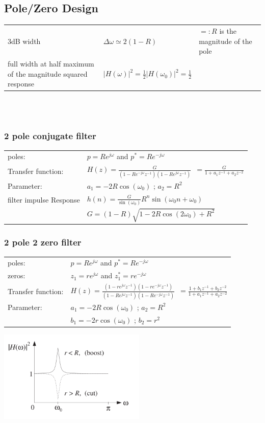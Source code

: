 \subsection{Pole/Zero Design}
\begin{tabularx}{1\textwidth}{Xll}
	3dB width & $\Delta\omega \simeq 2(1-R)$ & $=:R$ is the magnitude of the pole \\
	full width at half maximum of the magnitude squared response & $|H(\omega)|^2=\frac{1}{2}|H(\omega_0)|^2=\frac{1}{2}$&
\end{tabularx}\\ \\

\subsubsection{2 pole conjugate filter}

\begin{tabularx}{1\textwidth}{l X}
	poles: & $ p = R e^{j\omega}$ \qquad and \qquad $ p^* = R e^{-j\omega}$
	\\ 
	Transfer function: & $H(z)= \frac{G}{(1-R e^{-j\omega}z^{-1})(1-Re^{j\omega}z^{-1})}$\
	$=\frac{G}{1+a_1z^{-1}+a_2z^{-2}}$
	\\
	Parameter: & $a_1 = -2R\cos(\omega_0)$ \qquad; \qquad $a_2 = R^2$
	\\ 
	filter impulse Response & $h(n) = \frac{G}{\sin(\omega_0)}R^n \sin(\omega_0 n + \omega_0)$
	\\ 
	& $G = (1-R)\sqrt{1-2R\cos(2\omega_0)+ R^2}$
\end{tabularx}


\subsubsection{2 pole 2 zero filter}

\begin{tabular}[b]{l l}
	poles: & $ p = R e^{j\omega}$ \qquad and \qquad $ p^* = R e^{-j\omega}$
	\\ 
	zeros: & $ z_1 = r e^{j\omega}$ \qquad and \qquad $ z_1^* = r e^{-j\omega}$
	\\
	Transfer function: & $H(z)= \frac{(1-r e^{j\omega}z^{-1})(1-re^{-j\omega}z^{-1})}{(1-R e^{j\omega}z^{-1})(1-Re^{-j\omega}z^{-1})}$\
	$=\frac{1+b_1z^{-1}+b_2z^{-2}}{1+a_1z^{-1}+a_2z^{-2}}$
	\\ 
	Parameter: & $a_1 = -2R\cos(\omega_0)$ \qquad; \qquad $a_2 = R^2$
	\\ 
	& $b_1 = -2r\cos(\omega_0)$ \qquad; \qquad $b_2 = r^2$
\end{tabular}
\includegraphics[width=7cm]{./picture/pole_zero_filter}

